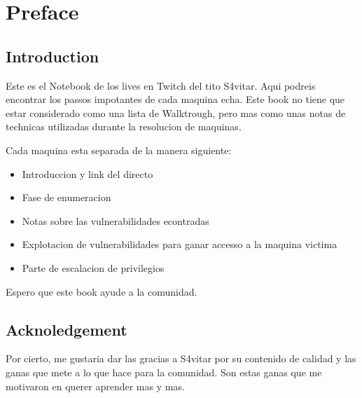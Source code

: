 \documentclass{assets/ipesethesis}
\providecommand{\tightlist}{%
  \setlength{\itemsep}{0pt}\setlength{\parskip}{0pt}}
\begin{document}


  \hypersetup{linkcolor=black}
  \setcounter{tocdepth}{1}
  \tableofcontents


\mainmatter %
\pagestyle{fancyplain} %

\hypertarget{preface-1}{%
\chapter*{Preface}\label{preface-1}}

\hypertarget{introduction-1}{%
\section*{Introduction}\label{introduction-1}}

Este es el Notebook de los lives en Twitch del tito S4vitar. Aqui podreis encontrar los passos impotantes de cada maquina
echa. Este book no tiene que estar considerado como una lista de Walktrough, pero mas como unas notas de technicas utilizadas
durante la resolucion de maquinas.

Cada maquina esta separada de la manera siguiente:

\begin{itemize}
\tightlist
\item
  Introduccion y link del directo
\item
  Fase de enumeracion
\item
  Notas sobre las vulnerabilidades econtradas
\item
  Explotacion de vulnerabilidades para ganar accesso a la maquina victima
\item
  Parte de escalacion de privilegios
\end{itemize}

Espero que este book ayude a la comunidad.

\hypertarget{acknoledgement-1}{%
\section*{Acknoledgement}\label{acknoledgement-1}}

Por cierto, me gustaria dar las gracias a S4vitar por su contenido de calidad y las ganas que mete a lo que hace para la comunidad.
Son estas ganas que me motivaron en querer aprender mas y mas.
\end{document}
